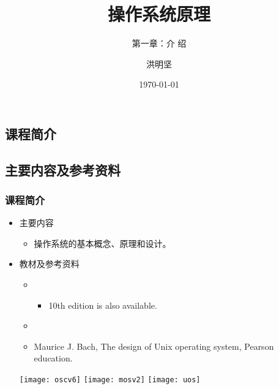 \documentclass[CJKutf8,xcolor=pdftex,dvipsnames,table]{beamer}
\begin{document}
\begin{CJK*}{UTF8}{song}  

  \title{操作系统原理}
  \subtitle{第一章：介 绍}
	\author{洪明坚}
  \date{\today}


  \frame{\titlepage}


  \section{课程简介}
  \subsection{主要内容及参考资料}

  \begin{frame}
    \frametitle{课程简介} \pause
	  \begin{itemize}
	    \item{主要内容} \pause
	      \begin{itemize}
	      \item{操作系统的基本概念、原理和设计。} \pause
	      \end{itemize}
	    \item{教材及参考资料} \pause
	      \begin{itemize}
	      \item{} \pause
	        \begin{itemize}
	        \item{10th edition is also available.} \pause
	        \end{itemize}
	      \item{} \pause
	      \item{Maurice J. Bach, The design of Unix operating system, Pearson education.} \pause
	      \end{itemize}
	    \begin{center}
	    	\texttt{[image: oscv6]}  \pause
			\hspace{1mm}
	    	\texttt{[image: mosv2]}  \pause
			\hspace{1mm}
	    	\texttt{[image: uos]}    \pause
	    \end{center}
	  \end{itemize}
  \end{frame}


\end{CJK*}
\end{document}
